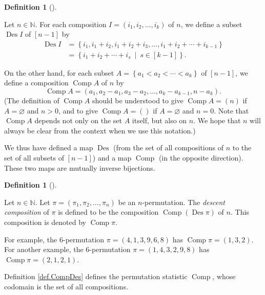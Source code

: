 \documentclass[numbers=enddot,12pt,final,onecolumn,notitlepage]{scrartcl}%
\theoremstyle{definition}
\newtheorem{defi}[theo]{Definition}
\newenvironment{definition}[1][]
{\begin{defi}[#1]\begin{leftbar}}
{\end{leftbar}\end{defi}}
\begin{document}
\begin{definition}
\label{def.comps-to-sets}Let $n\in\mathbb{N}$. For each composition $I=\left(
i_{1},i_{2},\ldots,i_{k}\right)  $ of $n$, we define a subset
$\operatorname*{Des}I$ of $\left[  n-1\right]  $ by%
\begin{align*}
\operatorname*{Des}I  &  =\left\{  i_{1},i_{1}+i_{2},i_{1}+i_{2}+i_{3}%
,\ldots,i_{1}+i_{2}+\cdots+i_{k-1}\right\} \\
&  =\left\{  i_{1}+i_{2}+\cdots+i_{s}\ \mid\ s\in\left[  k-1\right]  \right\}
.
\end{align*}


On the other hand, for each subset $A=\left\{  a_{1}<a_{2}<\cdots
<a_{k}\right\}  $ of $\left[  n-1\right]  $, we define a composition
$\operatorname*{Comp}A$ of $n$ by%
\[
\operatorname*{Comp}A=\left(  a_{1},a_{2}-a_{1},a_{3}-a_{2},\ldots
,a_{k}-a_{k-1},n-a_{k}\right)  .
\]
(The definition of $\operatorname*{Comp}A$ should be understood to give
$\operatorname*{Comp}A=\left(  n\right)  $ if $A=\varnothing$ and $n > 0$,
and to give
$\operatorname*{Comp}A=\left( \right)  $ if $A=\varnothing$ and $n = 0$.
Note that
$\operatorname*{Comp}A$ depends not only on the set $A$ itself, but also on
$n$. We hope that $n$ will always be clear from the context when we use this notation.)

We thus have defined a map $\operatorname*{Des}$ (from the set of all
compositions of $n$ to the set of all subsets of $\left[  n-1\right]  $) and a
map $\operatorname*{Comp}$ (in the opposite direction). These two maps are
mutually inverse bijections.
\end{definition}

\begin{definition}
\label{def.CompDes}Let $n\in\mathbb{N}$. Let $\pi=\left(  \pi_{1},\pi
_{2},\ldots,\pi_{n}\right)  $ be an $n$-permutation. The \textit{descent
composition} of $\pi$ is defined to be the composition $\operatorname*{Comp}%
\left(  \operatorname*{Des}\pi\right)  $ of $n$. This composition is denoted
by $\operatorname*{Comp}\pi$.
\end{definition}

For example, the $6$-permutation $\pi=\left(  4,1,3,9,6,8\right)  $ has
$\operatorname*{Comp}\pi=\left(  1,3,2\right)  $. For another example, the
$6$-permutation $\pi=\left(  1,4,3,2,9,8\right)  $ has $\operatorname*{Comp}%
\pi=\left(  2,1,2,1\right)  $.

Definition \ref{def.CompDes} defines the permutation statistic
$\operatorname*{Comp}$, whose codomain is the set of all compositions.
\end{document}
